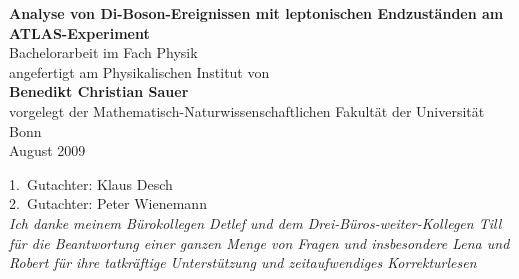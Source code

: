 \documentclass[a4paper,twoside]{scrartcl}
\author{Benedikt Christian Sauer}
\title{\mytitle}
\newcommand{\mytitle}{Analyse von Di-Boson-Ereignissen mit leptonischen
Endzuständen am ATLAS-Experiment}
\begin{document}
\begin{titlepage}
  \begin{center}
    \Huge{\bf\textsf{\mytitle}} \\
    \vspace{3cm}
    \Large Bachelorarbeit im Fach Physik \\
    \vspace{1cm}
    \normalsize angefertigt am Physikalischen Institut von \\
    \vspace{1cm}
    \large{\bf Benedikt Christian Sauer} \\
    \vspace{2cm}
    \normalsize vorgelegt der Mathematisch-Naturwissenschaftlichen Fakultät der Universität
    Bonn \\
    \vspace{1cm}
    \large August 2009
  \end{center}
\end{titlepage}
\newpage
\tableofcontents
\vfill
\begin{center}
  \large 1.\ Gutachter: Klaus Desch \\
  \large 2.\ Gutachter: Peter Wienemann \\
  \vspace{2cm}
  \textit{\Large Ich danke meinem Bürokollegen Detlef und dem
  Drei-Büros-weiter-Kollegen Till für die Beantwortung einer ganzen Menge von
  Fragen und insbesondere Lena und Robert für ihre tatkräftige Unterstützung und
  zeitaufwendiges Korrekturlesen}
\end{center}
\newpage




\end{document}
